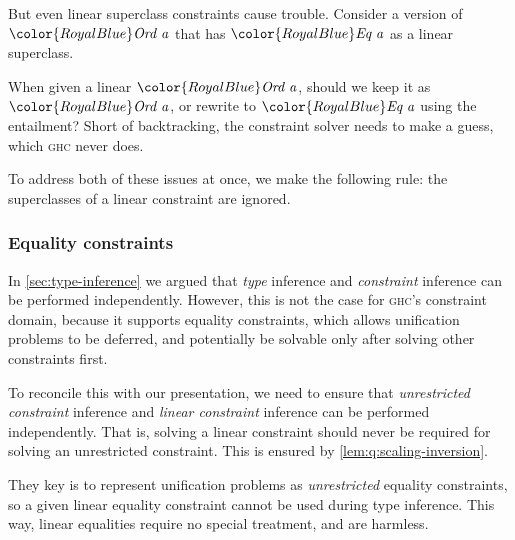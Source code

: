 \documentclass[acmsmall,usenames,dvipsnames,natbib=false,acmthm=false,screen]{acmart}
\newcommand{\Conid}[1]{\mathit{#1}}
\newcommand{\Varid}[1]{\mathit{#1}}
\def\resethooks{%
  \global\let\SaveRestoreHook\empty
  \global\let\ColumnHook\empty}
\let\hspre\empty
\let\hspost\empty
\newcommand{\constraintcolour}{\color{RoyalBlue}}
\newcommand{\constraintfont}[1]{{\constraintcolour#1}}
\newcommand{\constraintop}[1]{\mathop{\constraintfont{#1}}}
\newcommand{\lollycirc}{\raisebox{-0.255ex}{\scalebox{1.4}{$\circ$}}}
\newcommand{\Lolly}{\constraintop{=\kern-1.1ex \lollycirc}}
\theoremstyle{acmplain}
\theoremstyle{acmdefinition}
\begin{document}
But even linear superclass constraints cause trouble. Consider a version of \ensuremath{\constraintfont{\Conid{Ord}\;\Varid{a}}}
that has \ensuremath{\constraintfont{\Conid{Eq}\;\Varid{a}}} as a linear superclass.
\begin{hscode}\SaveRestoreHook
\column{B}{@{}>{\hspre}l<{\hspost}@{}}%
\column{E}{@{}>{\hspre}l<{\hspost}@{}}%
\>[B]{}\;\constraintfont{\Conid{Eq}\;\Varid{a}}\Lolly \constraintfont{\Conid{Ord}\;\Varid{a}}\;\<[E]%
\ColumnHook
\end{hscode}\resethooks
When given a linear \ensuremath{\constraintfont{\Conid{Ord}\;\Varid{a}}}, should we keep it as \ensuremath{\constraintfont{\Conid{Ord}\;\Varid{a}}}, or rewrite to
\ensuremath{\constraintfont{\Conid{Eq}\;\Varid{a}}} using the entailment? Short of backtracking, the constraint solver
needs to make a guess, which \textsc{ghc} never does.

To address both of these issues at once, we make the following rule: the
superclasses of a linear constraint are ignored.

\subsubsection{Equality constraints}
\label{sec:equality-constraints}

In \cref{sec:type-inference} we argued that \emph{type} inference and
\emph{constraint} inference can be performed independently. However, this is not
the case for \textsc{ghc}'s constraint domain, because it supports equality
constraints, which allows unification problems to be deferred, and potentially
be solvable only after solving other constraints first.

To reconcile this with our presentation, we need to ensure that
\emph{unrestricted constraint} inference and \emph{linear constraint} inference
can be performed independently. That is, solving a linear constraint should
never be required for solving an unrestricted constraint. This is ensured by
\cref{lem:q:scaling-inversion}.

They key is to represent unification problems as \emph{unrestricted} equality
constraints, so a given linear equality constraint cannot be used during type
inference.  This way, linear equalities require no
special treatment, and are harmless.

\end{document}
